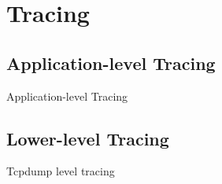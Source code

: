 \section{Tracing}
\label{sec:tracing}

\subsection{Application-level Tracing}
\label{ssec:app}
Application-level Tracing

\subsection{Lower-level Tracing}
\label{ssec:low}
Tcpdump level tracing

